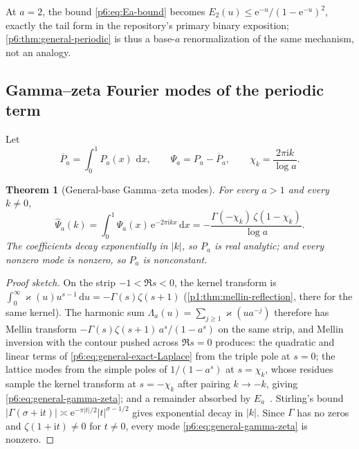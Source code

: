 \documentclass[11pt,oneside]{article}
\numberwithin{equation}{section}
\newtheorem{theorem}{Theorem}[section]
\theoremstyle{definition}
\theoremstyle{remark}
\newcommand{\dd}{\,\mathrm d}
\newcommand{\e}{\mathrm e}
\newcommand{\ii}{\mathrm i}
\begin{document}
At $a=2$, the bound \eqref{p6:eq:Ea-bound} becomes
$E_2(u)\le\e^{-u}/(1-\e^{-u})^2$, exactly the tail form in the repository's
primary binary exposition; \cref{p6:thm:general-periodic} is thus a base-$a$
renormalization of the same mechanism, not an analogy.

\subsection{Gamma--zeta Fourier modes of the periodic term}

Let
\begin{equation}\label{p6:eq:Psi-a}
 \overline P_a=\int_0^1P_a(x)\,\dd x,
 \qquad
 \Psi_a=P_a-\overline P_a,
 \qquad
 \chi_k=\frac{2\pi\ii k}{\log a}.
\end{equation}

\begin{theorem}[General-base Gamma--zeta modes]
\label{p6:thm:general-fourier-modes}
For every $a>1$ and every $k\ne0$,
\begin{equation}\label{p6:eq:general-gamma-zeta}
 \widehat\Psi_a(k)=\int_0^1\Psi_a(x)\,\e^{-2\pi\ii kx}\dd x
 =-\frac{\Gamma(-\chi_k)\,\zeta(1-\chi_k)}{\log a}.
\end{equation}
The coefficients decay exponentially in $|k|$, so $P_a$ is real analytic; and
every nonzero mode is nonzero, so $P_a$ is nonconstant.
\end{theorem}

\begin{proof}[Proof sketch]
On the strip $-1<\Re s<0$, the kernel transform is
$\int_0^\infty\varkappa(u)u^{s-1}\dd u=-\Gamma(s)\zeta(s+1)$
(\cref{p1:thm:mellin-reflection}, there for the same kernel).  The harmonic sum
$\Lambda_a(u)=\sum_{j\ge1}\varkappa(ua^{-j})$ therefore has Mellin transform
$-\Gamma(s)\zeta(s+1)\,a^{s}/(1-a^{s})$ on the same strip, and Mellin inversion
with the contour pushed across $\Re s=0$ produces: the quadratic and linear
terms of \eqref{p6:eq:general-exact-Laplace} from the triple pole at $s=0$; the
lattice modes from the simple poles of $1/(1-a^s)$ at $s=\chi_k$, whose
residues sample the kernel transform at $s=-\chi_k$ after pairing $k\to-k$,
giving \eqref{p6:eq:general-gamma-zeta}; and a remainder absorbed by
$E_a$~\cite{p6:flajolet-gd}.  Stirling's bound
$|\Gamma(\sigma+\ii t)|\asymp\e^{-\pi|t|/2}|t|^{\sigma-1/2}$ gives exponential
decay in $|k|$.  Since $\Gamma$ has no zeros and $\zeta(1+\ii t)\ne0$ for
$t\ne0$, every mode \eqref{p6:eq:general-gamma-zeta} is nonzero.
\end{proof}
\end{document}
